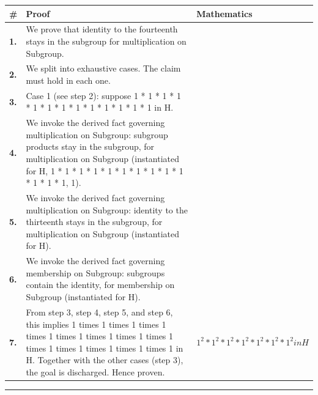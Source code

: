 \documentclass[11pt]{article}
\theoremstyle{definition}
\begin{document}
\begin{tabular}{@{} >{\raggedright\arraybackslash}p{} >{\raggedright\arraybackslash}p{} >{\raggedleft\arraybackslash}p{} @{}}
\textbf{\#} & \textbf{Proof} & \textbf{Mathematics} \\
\midrule
\textbf{1.} & We prove that identity to the fourteenth stays in the subgroup for multiplication on Subgroup. & \\[0.45em]
\textbf{2.} & We split into exhaustive cases. The claim must hold in each one. & \\[0.45em]
\textbf{3.} & Case 1 (see step 2): suppose 1 * 1 * 1 * 1 * 1 * 1 * 1 * 1 * 1 * 1 * 1 * 1 * 1 in H. & \\[0.45em]
\textbf{4.} & We invoke the derived fact governing multiplication on Subgroup: subgroup products stay in the subgroup, for multiplication on Subgroup (instantiated for H, 1 * 1 * 1 * 1 * 1 * 1 * 1 * 1 * 1 * 1 * 1 * 1 * 1, 1). & \\[0.45em]
\textbf{5.} & We invoke the derived fact governing multiplication on Subgroup: identity to the thirteenth stays in the subgroup, for multiplication on Subgroup (instantiated for H). & \\[0.45em]
\textbf{6.} & We invoke the derived fact governing membership on Subgroup: subgroups contain the identity, for membership on Subgroup (instantiated for H). & \\[0.45em]
\textbf{7.} & From step 3, step 4, step 5, and step 6, this implies 1 times 1 times 1 times 1 times 1 times 1 times 1 times 1 times 1 times 1 times 1 times 1 times 1 times 1 in H. Together with the other cases (step 3), the goal is discharged. Hence proven. & $\displaystyle 1^{2} * 1^{2} * 1^{2} * 1^{2} * 1^{2} * 1^{2} * 1^{2} in H$ \\[0.45em]
\bottomrule
\end{tabular}
\label{thm:Subgroup-multiplication-identity_to_the_fourteenth_stays_in_the_subgroup}
\par\medskip\hrule
\end{document}
